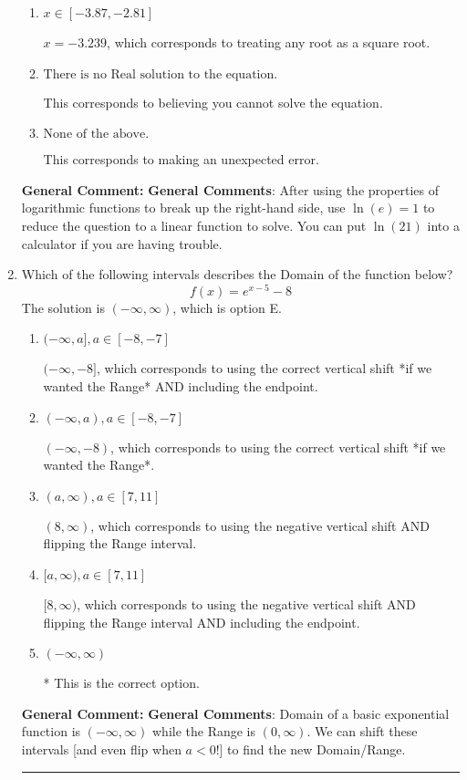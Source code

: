 \documentclass{extbook}[14pt]
\newcommand{\litem}[1]{\item #1

\rule{\textwidth}{0.4pt}}
\begin{document}
\begin{enumerate}
{\begin{enumerate}[label=\Alph*.]
$x = -2.321$, which corresponds to thinking you need to take the natural log of on the left before reducing.
\item \( x \in [-3.87, -2.81] \)

$x = -3.239$, which corresponds to treating any root as a square root.
\item \( \text{There is no Real solution to the equation.} \)

This corresponds to believing you cannot solve the equation.
\item \( \text{None of the above.} \)

This corresponds to making an unexpected error.
\end{enumerate}

\textbf{General Comment:} \textbf{General Comments}: After using the properties of logarithmic functions to break up the right-hand side, use $\ln(e) = 1$ to reduce the question to a linear function to solve. You can put $\ln(21)$ into a calculator if you are having trouble.
}
\litem{
Which of the following intervals describes the Domain of the function below?
\[ f(x) = e^{x-5}-8 \]
The solution is \( (-\infty, \infty) \), which is option E.\begin{enumerate}[label=\Alph*.]
\item \( (-\infty, a], a \in [-8, -7] \)

$(-\infty, -8]$, which corresponds to using the correct vertical shift *if we wanted the Range* AND including the endpoint.
\item \( (-\infty, a), a \in [-8, -7] \)

$(-\infty, -8)$, which corresponds to using the correct vertical shift *if we wanted the Range*.
\item \( (a, \infty), a \in [7, 11] \)

$(8, \infty)$, which corresponds to using the negative vertical shift AND flipping the Range interval.
\item \( [a, \infty), a \in [7, 11] \)

$[8, \infty)$, which corresponds to using the negative vertical shift AND flipping the Range interval AND including the endpoint.
\item \( (-\infty, \infty) \)

* This is the correct option.
\end{enumerate}

\textbf{General Comment:} \textbf{General Comments}: Domain of a basic exponential function is $(-\infty, \infty)$ while the Range is $(0, \infty)$. We can shift these intervals [and even flip when $a<0$!] to find the new Domain/Range.
}
\end{enumerate}
\end{document}
